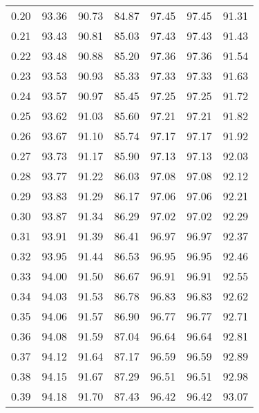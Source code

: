 \begin{tabular}{|c|c|c|c|c|c|c|}
      0.20 &     93.36 &     90.73 &      84.87 &   97.45 &      97.45 &         91.31 \\
      0.21 &     93.43 &     90.81 &      85.03 &   97.43 &      97.43 &         91.43 \\
      0.22 &     93.48 &     90.88 &      85.20 &   97.36 &      97.36 &         91.54 \\
      0.23 &     93.53 &     90.93 &      85.33 &   97.33 &      97.33 &         91.63 \\
      0.24 &     93.57 &     90.97 &      85.45 &   97.25 &      97.25 &         91.72 \\
      0.25 &     93.62 &     91.03 &      85.60 &   97.21 &      97.21 &         91.82 \\
      0.26 &     93.67 &     91.10 &      85.74 &   97.17 &      97.17 &         91.92 \\
      0.27 &     93.73 &     91.17 &      85.90 &   97.13 &      97.13 &         92.03 \\
      0.28 &     93.77 &     91.22 &      86.03 &   97.08 &      97.08 &         92.12 \\
      0.29 &     93.83 &     91.29 &      86.17 &   97.06 &      97.06 &         92.21 \\
      0.30 &     93.87 &     91.34 &      86.29 &   97.02 &      97.02 &         92.29 \\
      0.31 &     93.91 &     91.39 &      86.41 &   96.97 &      96.97 &         92.37 \\
      0.32 &     93.95 &     91.44 &      86.53 &   96.95 &      96.95 &         92.46 \\
      0.33 &     94.00 &     91.50 &      86.67 &   96.91 &      96.91 &         92.55 \\
      0.34 &     94.03 &     91.53 &      86.78 &   96.83 &      96.83 &         92.62 \\
      0.35 &     94.06 &     91.57 &      86.90 &   96.77 &      96.77 &         92.71 \\
      0.36 &     94.08 &     91.59 &      87.04 &   96.64 &      96.64 &         92.81 \\
      0.37 &     94.12 &     91.64 &      87.17 &   96.59 &      96.59 &         92.89 \\
      0.38 &     94.15 &     91.67 &      87.29 &   96.51 &      96.51 &         92.98 \\
      0.39 &     94.18 &     91.70 &      87.43 &   96.42 &      96.42 &         93.07 \\

\end{tabular}
